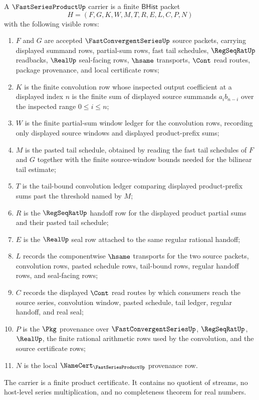 \begin{definition}
\label{def:fast-series-product-carrier}
A $\FastSeriesProductUp$ carrier is a finite $\mathsf{BHist}$ packet
$$
H=(F,G,K,W,M,T,R,E,L,C,P,N)
$$
with the following visible rows:
\begin{enumerate}
\item $F$ and $G$ are accepted $\FastConvergentSeriesUp$ source packets, carrying displayed summand rows, partial-sum rows, fast tail schedules, $\RegSeqRatUp$ readbacks, $\RealUp$ seal-facing rows, $\hsame$ transports, $\Cont$ read routes, package provenance, and local certificate rows;
\item $K$ is the finite convolution row whose inspected output coefficient at a displayed index $n$ is the finite sum of displayed source summands $a_i b_{n-i}$ over the inspected range $0 \leq i \leq n$;
\item $W$ is the finite partial-sum window ledger for the convolution rows, recording only displayed source windows and displayed product-prefix sums;
\item $M$ is the pasted tail schedule, obtained by reading the fast tail schedules of $F$ and $G$ together with the finite source-window bounds needed for the bilinear tail estimate;
\item $T$ is the tail-bound convolution ledger comparing displayed product-prefix sums past the threshold named by $M$;
\item $R$ is the $\RegSeqRatUp$ handoff row for the displayed product partial sums and their pasted tail schedule;
\item $E$ is the $\RealUp$ seal row attached to the same regular rational handoff;
\item $L$ records the componentwise $\hsame$ transports for the two source packets, convolution rows, pasted schedule rows, tail-bound rows, regular handoff rows, and seal-facing rows;
\item $C$ records the displayed $\Cont$ read routes by which consumers reach the source series, convolution window, pasted schedule, tail ledger, regular handoff, and real seal;
\item $P$ is the $\Pkg$ provenance over $\FastConvergentSeriesUp$, $\RegSeqRatUp$, $\RealUp$, the finite rational arithmetic rows used by the convolution, and the source certificate rows;
\item $N$ is the local $\NameCert_{\FastSeriesProductUp}$ provenance row.
\end{enumerate}
The carrier is a finite product certificate. It contains no quotient of streams, no host-level series multiplication, and no completeness theorem for real numbers.
\end{definition}

